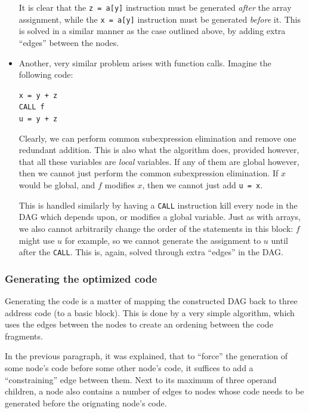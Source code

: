 \documentclass[a4paper]{article}
\begin{document}
\begin{itemize}
It is clear that the \texttt{z = a[y]} instruction must be generated
\emph{after} the array assignment, while the \texttt{x = a[y]} instruction
must be generated \emph{before} it. This is solved in a similar manner as the
case outlined above, by adding extra ``edges'' between the nodes.

\item Another, very similar problem arises with function calls. Imagine the
following code:\\
\begin{center}
\texttt{x = y + z}\\
\texttt{CALL f}\\
\texttt{u = y + z}\\
\end{center}

Clearly, we can perform common subexpression elimination and remove one
redundant addition. This is also what the algorithm does, provided however,
that all these variables are \emph{local} variables. If any of them are global
however, then we cannot just perform the common subexpression elimination. If
$x$ would be global, and $f$ modifies $x$, then we cannot just add \texttt{u = x}.

This is handled similarly by having a \texttt{CALL} instruction kill every
node in the DAG which depends upon, or modifies a global variable. Just as
with arrays, we also cannot arbitrarily change the order of the statements in
this block: $f$ might use $u$ for example, so we cannot generate the
assignment to $u$ until after the \texttt{CALL}. This is, again, solved
through extra ``edges'' in the DAG.
\end{itemize}

\subsubsection{Generating the optimized code}
\label{optimizingcode}

Generating the code is a matter of mapping the constructed DAG back to three
address code (to a basic block). This is done by a very simple algorithm,
which uses the edges between the nodes to create an ordening between the code
fragments.

In the previous paragraph, it was explained, that to ``force'' the generation
of some node's code before some other node's code, it suffices to add a
``constraining'' edge between them. Next to its maximum of three operand
children, a node also contains a number of edges to nodes whose code needs to
be generated before the orignating node's code.
\end{document}

